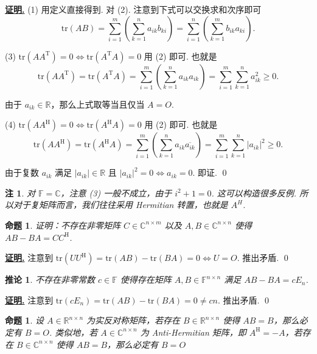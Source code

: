 \documentclass[10pt,openany]{article}
\theoremstyle{thmstyle} %
\theoremstyle{defstyle} %
\newtheorem{corollary}[theorem]{推论}
\theoremstyle{prostyle} %
\newtheorem{proposition}[theorem]{命题}
\theoremstyle{exastyle}
\theoremstyle{remstyle}
\newtheorem{remark}[theorem]{注}
\renewenvironment{proof}[1][证明]{\par\underline{\textbf{#1.}} \;\fangsong}{\qed\par}
\newcommand{\T}{^{\text{T}}}
\newcommand{\Her}{^{\text{H}}}
\newcommand{\F}{\mathbb{F}}
\newcommand{\C}{\mathbb{C}}
\newcommand{\R}{\mathbb{R}}
\newcommand{\n}{^{n \times n}}
\newcommand{\nm}{^{n \times m}}
\newcommand{\tr}{\mathrm{tr}}
\begin{document}
\begin{proof}
	(1) 用定义直接得到. 对 (2). 注意到下式可以交换求和次序即可
	\[ \tr(AB)=\sum_{i=1}^{m} \left( \sum_{k=1}^{n} a_{ik}b_{ki} \right)= \sum_{i=1}^{n} \left( \sum_{k=1}^{m} b_{ik}a_{ki} \right). \]
	
	(3) \( \tr(AA\T)=0 \Leftrightarrow \tr(A\T A)=0 \) 用 (2) 即可. 也就是
	\[ \tr(AA\T)=\tr(A\T A)= \sum_{i=1}^{m} \left( \sum_{k=1}^{n} a_{ik}a_{ik} \right)= \sum_{i=1}^{m}\sum_{k=1}^{n} a_{ik}^2 \geq 0. \]
	
	由于 \( a_{ik} \in \mathbb{R} \)，那么上式取等当且仅当 \( A=O \).
	
	(4) \( \tr(AA\Her)=0 \Leftrightarrow \tr(A\Her A)=0 \) 用 (2) 即可. 也就是
	\[ \tr(AA\Her)=\tr(A\Her A)= \sum_{i=1}^{m} \left( \sum_{k=1}^{n} a_{ik}\overline{a_{ik}} \right)= \sum_{i=1}^{m}\sum_{k=1}^{n} |a_{ik}|^2 \geq 0. \]
	
	由于复数 \( a_{ik} \) 满足 \( |a_{ik}| \in \mathbb{R} \) 且 \( |a_{ik}|^2=0 \Leftrightarrow a_{ik}=0 \). 即证. 
\end{proof}


\begin{remark}
	对 \( \F=\mathbb{C} \)，注意 (3) 一般不成立，由于 \( i^2+1=0 \). 这可以构造很多反例. 所以对于复矩阵而言，我们往往采用 Hermitian 转置，也就是 \( A^H \).
\end{remark}

\begin{proposition}
	证明：不存在非零矩阵 \( C \in \C\nm \) 以及 \( A,B \in \C\n \) 使得 \( AB-BA=CC\Her \). 
\end{proposition}

\begin{proof}
	注意到 \( \tr(UU\Her)=\tr(AB)-\tr(BA)=0 \Leftrightarrow U=O \). 推出矛盾.
\end{proof}

\begin{corollary}
   不存在非零常数 \( c \in \F \) 使得存在矩阵  \( A,B \in \F\n \) 满足 \( AB-BA=cE_n \).
\end{corollary}

\begin{proof}
	注意到 \( \tr(cE_n)=\tr(AB)-\tr(BA)=0 \neq cn \). 推出矛盾.
\end{proof}


\begin{proposition}
	设 \( A \in \R\n \) 为实反对称矩阵，若存在 \( B \in \R\n \) 使得 \( AB=B \)，那么必定有 \( B=O \). 类似地，若 \( A \in \C\n \) 为 Anti-Hermitian 矩阵，即 \( A\Her=-A \)，若存在 \( B \in \C\n \) 使得 \( AB=B \)，那么必定有 \( B=O \) 
\end{proposition}
\end{document}
